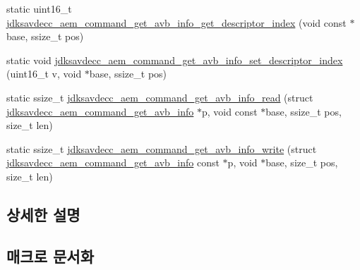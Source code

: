 \begin{DoxyCompactItemize}
\item 
static uint16\+\_\+t \hyperlink{group__command__get__avb__info_gaf48e4829b2316cc9110e700cca036cab}{jdksavdecc\+\_\+aem\+\_\+command\+\_\+get\+\_\+avb\+\_\+info\+\_\+get\+\_\+descriptor\+\_\+index} (void const $\ast$base, ssize\+\_\+t pos)
\item 
static void \hyperlink{group__command__get__avb__info_ga174fdb55b77734b10651a9113f352feb}{jdksavdecc\+\_\+aem\+\_\+command\+\_\+get\+\_\+avb\+\_\+info\+\_\+set\+\_\+descriptor\+\_\+index} (uint16\+\_\+t v, void $\ast$base, ssize\+\_\+t pos)
\item 
static ssize\+\_\+t \hyperlink{group__command__get__avb__info_gab7a79c963e88f313e84105ab9bc9eeeb}{jdksavdecc\+\_\+aem\+\_\+command\+\_\+get\+\_\+avb\+\_\+info\+\_\+read} (struct \hyperlink{structjdksavdecc__aem__command__get__avb__info}{jdksavdecc\+\_\+aem\+\_\+command\+\_\+get\+\_\+avb\+\_\+info} $\ast$p, void const $\ast$base, ssize\+\_\+t pos, size\+\_\+t len)
\item 
static ssize\+\_\+t \hyperlink{group__command__get__avb__info_ga235313d7eff8881fed9a1f5d749a497f}{jdksavdecc\+\_\+aem\+\_\+command\+\_\+get\+\_\+avb\+\_\+info\+\_\+write} (struct \hyperlink{structjdksavdecc__aem__command__get__avb__info}{jdksavdecc\+\_\+aem\+\_\+command\+\_\+get\+\_\+avb\+\_\+info} const $\ast$p, void $\ast$base, size\+\_\+t pos, size\+\_\+t len)
\end{DoxyCompactItemize}


\subsection{상세한 설명}


\subsection{매크로 문서화}
